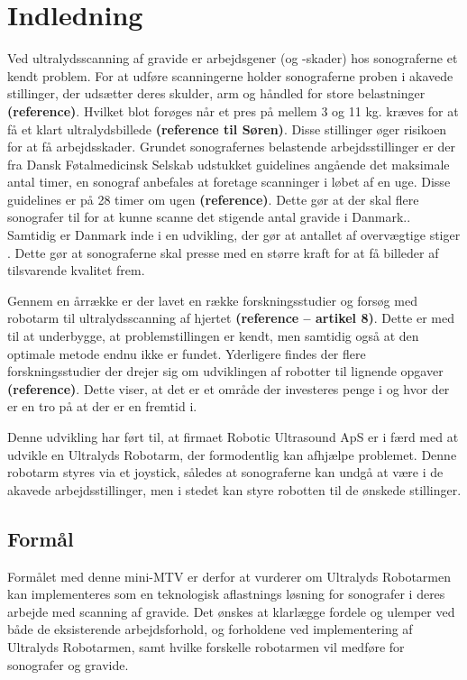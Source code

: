 \chapter{Indledning} 
Ved ultralydsscanning af gravide er arbejdsgener (og -skader) hos sonograferne et kendt problem. For at udføre scanningerne holder sonograferne proben i akavede stillinger, der udsætter deres skulder, arm og håndled for store belastninger \textbf{(reference)}. Hvilket blot forøges når et pres på mellem 3 og 11 kg. kræves for at få et klart ultralydsbillede \textbf{(reference til Søren)}. Disse stillinger øger risikoen for at få arbejdsskader. Grundet sonografernes belastende arbejdsstillinger er der fra Dansk Føtalmedicinsk Selskab udstukket guidelines angående det maksimale antal timer, en sonograf anbefales at foretage scanninger i løbet af en uge. Disse guidelines er på 28 timer om ugen \textbf{(reference)}. Dette gør at der skal flere sonografer til for at kunne scanne det stigende antal gravide i Danmark.\cite{Foedsler}. \\
Samtidig er Danmark inde i en udvikling, der gør at antallet af overvægtige stiger \cite{Overvaegt}. Dette gør at sonograferne skal presse med en større kraft for at få billeder af tilsvarende kvalitet frem. 

Gennem en årrække er der lavet en række forskningsstudier og forsøg med robotarm til ultralydsscanning af hjertet \textbf{(reference – artikel 8)}. Dette er med til at underbygge, at problemstillingen er kendt, men samtidig også at den optimale metode endnu ikke er fundet. Yderligere findes der flere forskningsstudier der drejer sig om udviklingen af robotter til lignende opgaver \textbf{(reference)}. Dette viser, at det er et område der investeres penge i og hvor der er en tro på at der er en fremtid i. 

Denne udvikling har ført til, at firmaet Robotic Ultrasound ApS er i færd med at udvikle en Ultralyds Robotarm, der formodentlig kan afhjælpe problemet. Denne robotarm styres via et joystick, således at sonograferne kan undgå at være i de akavede arbejdsstillinger, men i stedet kan styre robotten til de ønskede stillinger. 


\section{Formål}
Formålet med denne mini-MTV er derfor at vurderer om Ultralyds Robotarmen kan implementeres som en teknologisk aflastnings løsning for sonografer i deres arbejde med scanning af gravide. Det ønskes at klarlægge fordele og ulemper ved både de eksisterende arbejdsforhold, og forholdene ved implementering af Ultralyds Robotarmen, samt hvilke forskelle robotarmen vil medføre for sonografer og gravide.


